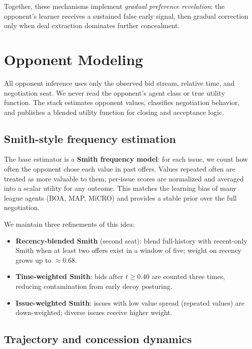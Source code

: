 \documentclass[11pt]{article}
\begin{document}
Together, these mechanisms implement \emph{gradual preference revelation}: the opponent's
learner receives a sustained false early signal, then gradual correction only when deal
extraction dominates further concealment.

\section{Opponent Modeling}

All opponent inference uses only the observed bid stream, relative time, and negotiation seat.
We never read the opponent's agent class or true utility function.
The stack estimates opponent values, classifies negotiation behavior, and publishes a blended
utility function for closing and acceptance logic.

\subsection{Smith-style frequency estimation}

The base estimator is a \textbf{Smith frequency model}: for each issue, we count how often the
opponent chose each value in past offers.
Values repeated often are treated as more valuable to them; per-issue scores are normalized and
averaged into a scalar utility for any outcome.
This matches the learning bias of many league agents (BOA, MAP, MiCRO) and provides a stable
prior over the full negotiation.

We maintain three refinements of this idea:
\begin{itemize}
  \item \textbf{Recency-blended Smith} (second seat): blend full-history with recent-only Smith
        when at least two offers exist in a window of five; weight on recency grows up to
        ${\approx}0.68$.
  \item \textbf{Time-weighted Smith}: bids after $t \ge 0.40$ are counted three times, reducing
        contamination from early decoy posturing.
  \item \textbf{Issue-weighted Smith}: issues with low value spread (repeated values) are
        down-weighted; diverse issues receive higher weight.
\end{itemize}

\subsection{Trajectory and concession dynamics}
\end{document}
